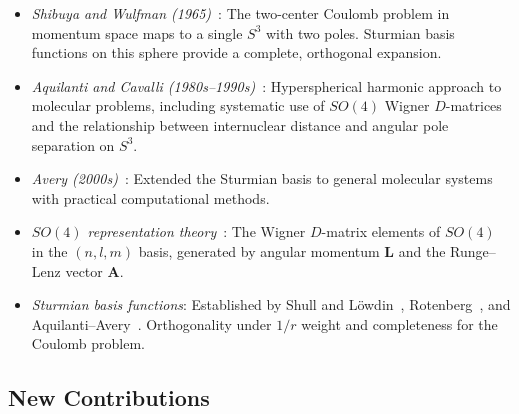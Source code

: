 \documentclass[aps,pra,twocolumn,superscriptaddress,longbibliography]{revtex4-2}
\begin{document}
\begin{itemize}

\item \textit{Shibuya and Wulfman (1965)}~\cite{Shibuya1965}: The
two-center Coulomb problem in momentum space maps to a single $S^3$
with two poles.  Sturmian basis functions on this sphere provide a
complete, orthogonal expansion.

\item \textit{Aquilanti and Cavalli
(1980s--1990s)}~\cite{Aquilanti1986,Aquilanti1990}: Hyperspherical
harmonic approach to molecular problems, including systematic use of
$SO(4)$ Wigner $D$-matrices and the relationship between internuclear
distance and angular pole separation on $S^3$.

\item \textit{Avery (2000s)}~\cite{Avery2006}: Extended the Sturmian
basis to general molecular systems with practical computational methods.

\item \textit{$SO(4)$ representation theory}~\cite{Bander1966,%
Biedenharn1981}: The Wigner $D$-matrix elements of $SO(4)$ in the
$(n, l, m)$ basis, generated by angular momentum $\mathbf{L}$ and the
Runge--Lenz vector $\mathbf{A}$.

\item \textit{Sturmian basis functions}: Established by Shull and
L\"owdin~\cite{shull_lowdin}, Rotenberg~\cite{rotenberg}, and
Aquilanti--Avery~\cite{aquilanti_avery,avery_book}.  Orthogonality
under $1/r$ weight and completeness for the Coulomb problem.

\end{itemize}

\subsection{New Contributions}
\end{document}

